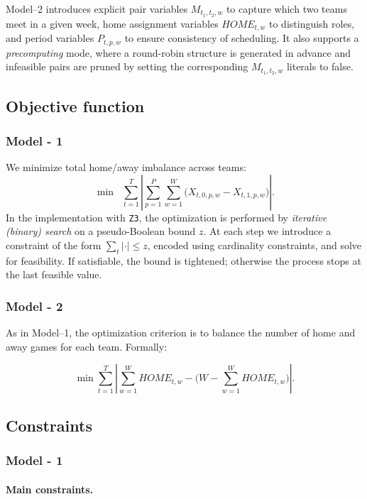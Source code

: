 \documentclass{article}
\begin{document}
Model--2 introduces explicit pair variables \(M_{t_1,t_2,w}\) to capture
which two teams meet in a given week, home assignment variables
\(HOME_{t,w}\) to distinguish roles, and period variables
\(P_{t,p,w}\) to ensure consistency of scheduling. It also supports
a \emph{precomputing} mode, where a round-robin structure is generated
in advance and infeasible pairs are pruned by setting the corresponding
\(M_{t_1,t_2,w}\) literals to false.


\subsection{Objective function}

\subsubsection{Model - 1}

We minimize total home/away imbalance across teams:
\[
\min \;\; \sum_{t=1}^{T} \left| 
\sum_{p=1}^{P}\sum_{w=1}^{W} \big( X_{t,0,p,w} - X_{t,1,p,w} \big)
\right|.
\]
In the implementation with \texttt{Z3}, the optimization is performed by 
\emph{iterative (binary) search} on a pseudo-Boolean bound \(z\). 
At each step we introduce a constraint of the form 
\(\sum_t \lvert \cdot \rvert \leq z\), encoded using cardinality 
constraints, and solve for feasibility. If satisfiable, the bound 
is tightened; otherwise the process stops at the last feasible value.

\subsubsection{Model - 2 }

As in Model--1, the optimization criterion is to balance the number of
home and away games for each team. Formally:

\[
\min \sum_{t=1}^T \left| \sum_{w=1}^W HOME_{t,w}
      - \Big(W - \sum_{w=1}^W HOME_{t,w}\Big) \right|.
\]


\subsection{Constraints}

\subsubsection{Model - 1 }

\paragraph{Main constraints.}
\end{document}
